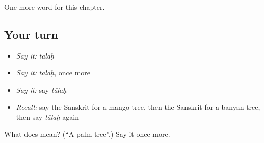 \begin{grammarlens}[title={What you've built}]
One more word for this chapter.
\end{grammarlens}

\subsection*{Your turn}
\begin{itemize}
\raggedright
  \item \emph{Say it:} \emph{tālaḥ}
  \item \emph{Say it:} \emph{tālaḥ}, once more
  \item \emph{Say it:} say \emph{tālaḥ}
  \item \emph{Recall:} say the Sanskrit for a mango tree, then the Sanskrit for a banyan tree, then say \emph{tālaḥ} again
\end{itemize}

\begin{tcolorbox}[breakable,colback=teal!4,colframe=teal!35!black,title={Before you move on}]
What does  mean? (\textquotedblleft{}A palm tree\textquotedblright{}.) Say it once more.
\end{tcolorbox}
